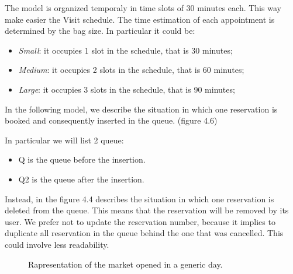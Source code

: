 The model is organized temporaly in time slots of 30 minutes each. This way make easier the Visit schedule. The time estimation of each appointment is determined by the bag size. In particular it could be:
\begin{itemize}
\item \textit{Small}: it occupies 1 slot in the schedule, that is 30 minutes;
\item \textit{Medium}: it occupies 2 slots in the schedule, that is 60 minutes;
\item \textit{Large}: it occupies 3 slots in the schedule, that is 90 minutes;
\end{itemize}


In the following model, we describe the situation in which one reservation is booked and consequently inserted in the queue. (figure 4.6)

In particular we will list 2 queue:
\begin{itemize}
\item Q is the queue before the insertion.
\item Q2 is the queue after the insertion.
\end{itemize}



Instead, in the figure 4.4 describes the situation in which one reservation is deleted from the queue.
This means that the reservation will be removed by its user.
We prefer not to update the reservation number, because it implies to duplicate all reservation in the queue behind the one that was cancelled. This could involve less readability.

\pagebreak



\pagebreak

\begin{figure}[H]
  \label{marketOpened}
  \centering
    \caption{Rapresentation of the market opened in a generic day.}
\end{figure}

